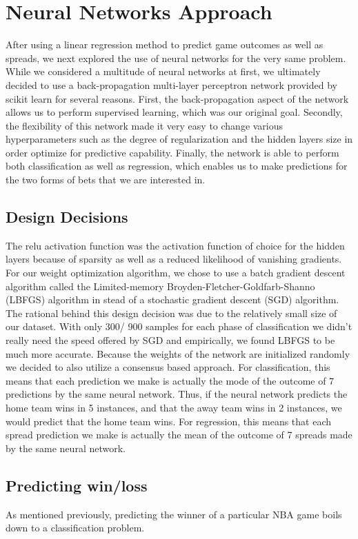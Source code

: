 \documentclass{article}
\begin{document}
\section{Neural Networks Approach}
After using a linear regression method to predict game outcomes as well as spreads, we next explored the use of neural networks for the very same problem. While we considered a multitude of neural networks at first, we ultimately decided to use a back-propagation multi-layer perceptron network provided by scikit learn for several reasons. First, the back-propagation aspect of the network allows us to perform supervised learning, which was our original goal. Secondly, the flexibility of this network made it very easy to change various hyperparameters such as the degree of regularization and the hidden layers size in order optimize for predictive capability. Finally, the network is able to perform both classification as well as regression, which enables us to make predictions for the two forms of bets that we are interested in.

\subsection{Design Decisions}
The relu activation function was the activation function of choice for the hidden layers because of sparsity as well as a reduced likelihood of vanishing gradients. For our weight optimization algorithm, we chose to use a batch gradient descent algorithm called the Limited-memory Broyden-Fletcher-Goldfarb-Shanno (LBFGS) algorithm in stead of a stochastic gradient descent (SGD) algorithm. The rational behind this design decision was due to the relatively small size of our dataset. With only 300/ 900 samples for each phase of classification we didn't really need the speed offered by SGD and empirically, we found LBFGS to be much more accurate. Because the weights of the network are initialized randomly we decided to also utilize a consensus based approach. For classification, this means that each prediction we make is actually the mode of the outcome of 7 predictions by the same neural network. Thus, if the neural network predicts the home team wins in 5 instances, and that the away team wins in 2 instances, we would predict that the home team wins. For regression, this means that each spread prediction we make is actually the mean of the outcome of 7 spreads made by the same neural network.

\subsection{Predicting win/loss}
As mentioned previously, predicting the winner of a particular NBA game boils down to a classification problem. 
\end{document}

